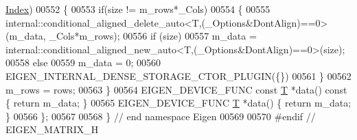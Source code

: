 \begin{DoxyCode}
      \hyperlink{namespace_eigen_a62e77e0933482dafde8fe197d9a2cfde}{Index})
00552     \{
00553       \textcolor{keywordflow}{if}(size != m\_rows*\_Cols)
00554       \{
00555         internal::conditional\_aligned\_delete\_auto<T,(\_Options&DontAlign)==0>(m\_data, \_Cols*m\_rows);
00556         \textcolor{keywordflow}{if} (size)
00557           m\_data = internal::conditional\_aligned\_new\_auto<T,(\_Options&DontAlign)==0>(size);
00558         \textcolor{keywordflow}{else}
00559           m\_data = 0;
00560         EIGEN\_INTERNAL\_DENSE\_STORAGE\_CTOR\_PLUGIN(\{\})
00561       \}
00562       m\_rows = rows;
00563     \}
00564     EIGEN\_DEVICE\_FUNC \textcolor{keyword}{const} \hyperlink{group___sparse_core___module_class_eigen_1_1_triplet}{T} *data()\textcolor{keyword}{ const }\{ \textcolor{keywordflow}{return} m\_data; \}
00565     EIGEN\_DEVICE\_FUNC \hyperlink{group___sparse_core___module_class_eigen_1_1_triplet}{T} *data() \{ \textcolor{keywordflow}{return} m\_data; \}
00566 \};
00567 
00568 \} \textcolor{comment}{// end namespace Eigen}
00569 
00570 \textcolor{preprocessor}{#endif // EIGEN\_MATRIX\_H}
\end{DoxyCode}
